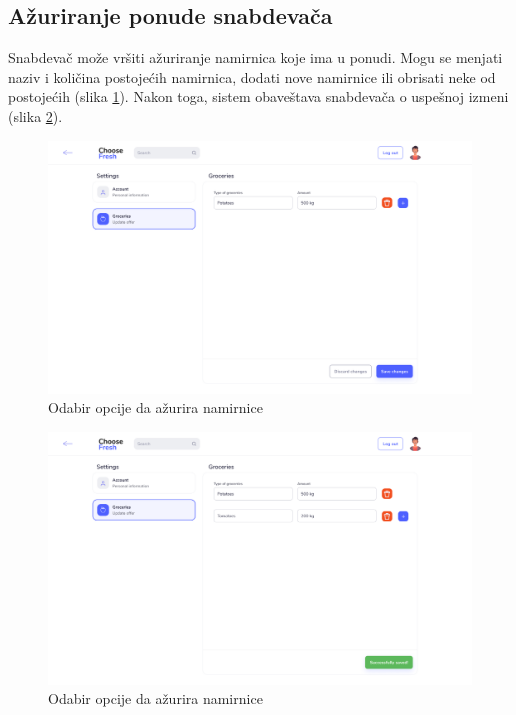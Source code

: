 \subsection{Ažuriranje ponude snabdevača}

Snabdevač može vršiti ažuriranje namirnica koje ima u ponudi. Mogu se menjati naziv i količina postojećih namirnica, dodati nove namirnice ili obrisati neke od postojećih (slika \ref{fig:SupplierGroceriesUpdateScreen1}). Nakon toga, sistem obaveštava snabdevača o uspešnoj izmeni (slika \ref{fig:SupplierGroceriesUpdateScreen2}).

\begin{figure}[H]
	\begin{center}
		\includegraphics[width=\textwidth]{UI/Supplier Groceries Update (Screen 1).png}
    		\caption{Odabir opcije da ažurira namirnice}
    \label{fig:SupplierGroceriesUpdateScreen1}
    \end{center}
\end{figure}

\begin{figure}[H]
	\begin{center}
		\includegraphics[width=\textwidth]{UI/Supplier Groceries Update (Screen 2).png}
    		\caption{Odabir opcije da ažurira namirnice}
    \label{fig:SupplierGroceriesUpdateScreen2}
    \end{center}
\end{figure}
